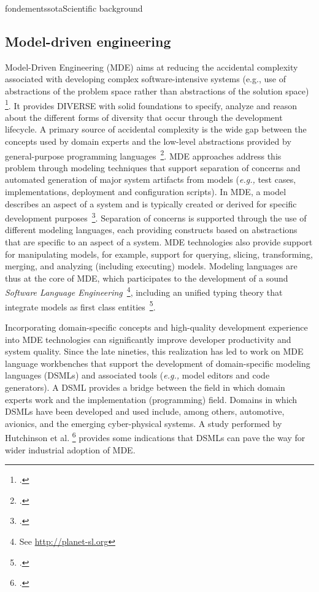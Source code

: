 \documentclass{ra2018}
\newcommand{\team}{DIVERSE}
\begin{document}
\begin{module}{fondements}{sota}{Scientific background}
\label{sec:sota}

\subsection{Model-driven engineering}    

Model-Driven Engineering (MDE) aims at reducing the accidental complexity associated with developing complex software-intensive systems (e.g., use of abstractions of the problem space rather than abstractions of the solution space)  \footcite{Schmidt06}. It provides \team{} with solid foundations to specify, analyze and reason about the different forms of diversity that occur through the development lifecycle. A primary source of accidental complexity is the wide gap between the concepts used by domain experts and the low-level abstractions provided by general-purpose programming languages~\footcite{France07}. MDE approaches address this problem through  modeling techniques that support separation of concerns and automated generation of major system artifacts from models (\emph{e.g.,} test cases, implementations, deployment and configuration scripts). In MDE, a model describes an aspect of a system and is typically created or derived for specific development purposes~\footcite{BAN04}. Separation of concerns is supported through the use of different modeling languages, each providing constructs based on abstractions that are specific to an aspect of a system. MDE technologies also provide support for manipulating models, for example, support for querying, slicing, transforming, merging, and analyzing (including executing) models. Modeling languages are thus at the core of MDE, which participates to the development of a sound \emph{Software Language Engineering}~\footnote{See \url{http://planet-sl.org}}, including an unified typing theory that integrate models as first class entities~\footcite{Steel07a}. 

Incorporating domain-specific concepts and high-quality development experience into MDE technologies can significantly improve developer productivity and system quality. Since the late nineties, this realization has led to work on MDE language workbenches that support the development of domain-specific modeling languages (DSMLs) and associated tools (\emph{e.g.,} model editors and code generators). A DSML provides a bridge between the field in which domain experts work and the implementation (programming) field. Domains in which DSMLs have been developed and used include, among others, automotive, avionics, and the emerging cyber-physical systems. A study performed by Hutchinson et al.   \footcite{Hutchinson11} provides some indications that DSMLs can pave the way for wider industrial adoption of MDE.


\end{module}
\end{document}

